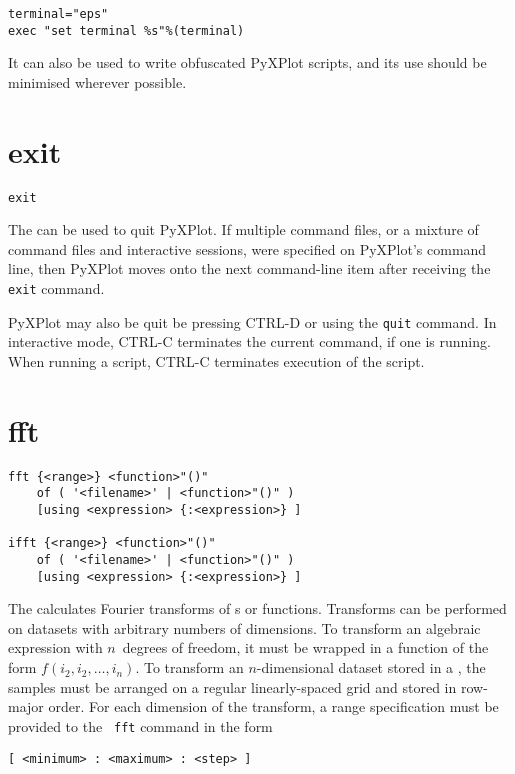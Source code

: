 \begin{verbatim}
terminal="eps"
exec "set terminal %s"%(terminal)
\end{verbatim}

\noindent It can also be used to write obfuscated PyXPlot scripts, and its use
should be minimised wherever possible.


\section{exit}

\begin{verbatim}
exit
\end{verbatim}

The  can be used to quit PyXPlot. If multiple command files,
or a mixture of command files and interactive sessions, were specified on
PyXPlot's command line, then PyXPlot moves onto the next command-line item
after receiving the {\tt exit} command.

PyXPlot may also be quit be pressing CTRL-D or using the {\tt quit} command. In
interactive mode, CTRL-C terminates the current command, if one is running.
When running a script, CTRL-C terminates execution of the script.


\section{fft}

\begin{verbatim}
fft {<range>} <function>"()"
    of ( '<filename>' | <function>"()" )
    [using <expression> {:<expression>} ]

ifft {<range>} <function>"()"
    of ( '<filename>' | <function>"()" )
    [using <expression> {:<expression>} ]
\end{verbatim}

The  calculates Fourier transforms of \datafile s or functions.
Transforms can be performed on datasets with arbitrary numbers of dimensions.
To transform an algebraic expression with $n$~degrees of freedom, it must be
wrapped in a function of the form $f(i_2,i_2,\ldots,i_n)$. To transform an
$n$-dimensional dataset stored in a \datafile, the samples must be arranged on
a regular linearly-spaced grid and stored in row-major order.  For each
dimension of the transform, a range specification must be provided to the {\tt
fft} command in the form

\begin{verbatim}
[ <minimum> : <maximum> : <step> ]
\end{verbatim}

